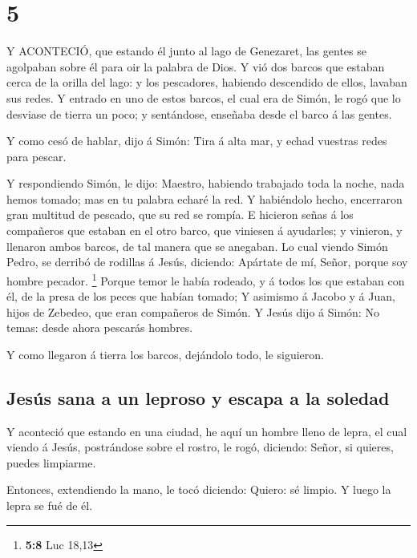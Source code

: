 \hypertarget{section-4}{%
\section{5}\label{section-4}}

 Y ACONTECIÓ, que estando él junto al lago de Genezaret, las
gentes se agolpaban sobre él para oir la palabra de Dios.  Y
vió dos barcos que estaban cerca de la orilla del lago: y los
pescadores, habiendo descendido de ellos, lavaban sus redes.
 Y entrado en uno de estos barcos, el cual era de Simón, le
rogó que lo desviase de tierra un poco; y sentándose, enseñaba desde el
barco á las gentes.

 Y como cesó de hablar, dijo á Simón: Tira á alta mar, y
echad vuestras redes para pescar.

 Y respondiendo Simón, le dijo: Maestro, habiendo trabajado
toda la noche, nada hemos tomado; mas en tu palabra echaré la red.
 Y habiéndolo hecho, encerraron gran multitud de pescado,
que su red se rompía.  E hicieron señas á los compañeros que
estaban en el otro barco, que viniesen á ayudarles; y vinieron, y
llenaron ambos barcos, de tal manera que se anegaban.  Lo
cual viendo Simón Pedro, se derribó de rodillas á Jesús, diciendo:
Apártate de mí, Señor, porque soy hombre pecador. \footnote{\textbf{5:8}
  Luc 18,13}  Porque temor le había rodeado, y á todos los
que estaban con él, de la presa de los peces que habían tomado;
 Y asimismo á Jacobo y á Juan, hijos de Zebedeo, que eran
compañeros de Simón. Y Jesús dijo á Simón: No temas: desde ahora
pescarás hombres.

 Y como llegaron á tierra los barcos, dejándolo todo, le
siguieron.

\hypertarget{jesuxfas-sana-a-un-leproso-y-escapa-a-la-soledad}{%
\subsection{Jesús sana a un leproso y escapa a la
soledad}\label{jesuxfas-sana-a-un-leproso-y-escapa-a-la-soledad}}

 Y aconteció que estando en una ciudad, he aquí un hombre
lleno de lepra, el cual viendo á Jesús, postrándose sobre el rostro, le
rogó, diciendo: Señor, si quieres, puedes limpiarme.

 Entonces, extendiendo la mano, le tocó diciendo: Quiero:
sé limpio. Y luego la lepra se fué de él.

